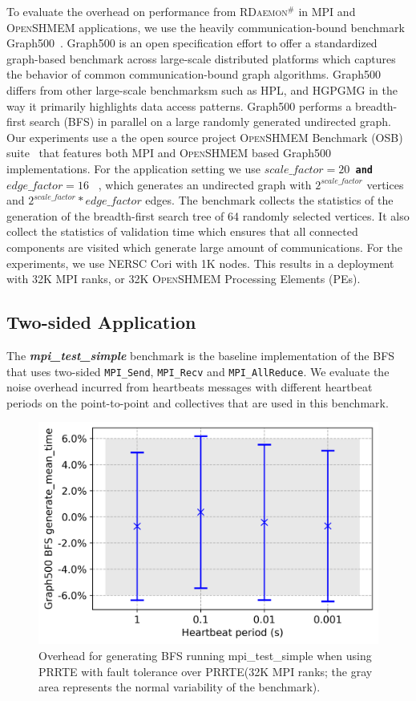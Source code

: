 \documentclass[5p,times,twocolumn]{elsarticle}
\newcommand{\mpifunc}[1]{\lstinline"MPI_#1"\xspace}
\newcommand{\prrte}[0]{\textsc{PRRTE}\xspace}
\newcommand{\mpi}[0]{\textsc{MPI}\xspace}
\newcommand{\oshmem}[0]{\textsc{OpenSHMEM}\xspace}
\newcommand{\ourwork}[0]{\textsc{RDaemon}\ensuremath{^\#}\xspace}
\begin{document}
To evaluate the overhead on performance from \ourwork
in \mpi and \oshmem applications, we use the heavily communication-bound benchmark Graph500~\cite{graph500}.
Graph500 is an open specification effort to offer a standardized graph-based
benchmark across large-scale distributed
platforms which captures the behavior of common communication-bound graph algorithms.
Graph500 differs from other large-scale
benchmarksm such as HPL, and HGPGMG in the way it primarily highlights data access patterns.
Graph500 performs a breadth-first search (BFS) in
parallel on a large randomly generated undirected graph. Our experiments use a
the open source project \oshmem Benchmark (OSB) suite~\cite{g500shmem} that features both \mpi and \oshmem based 
Graph500 implementations. For the application setting we use \texttt{\bf $scale\_factor = 20$ and $edge\_factor = 16$ }
, which generates an undirected graph with \texttt{\bf $2^{scale\_factor}$} vertices and
\texttt{\bf $2^{scale\_factor}*edge\_factor$} edges. The benchmark collects the statistics
of the generation of the breadth-first search tree of 64 randomly selected vertices. It also
collect the statistics of validation time which ensures that all connected components are visited
which generate large amount of communications. For the experiments, we use NERSC Cori with 1K nodes. This results in a deployment with 32K \mpi  ranks, or 32K \oshmem Processing Elements (PEs). 

\subsection{Two-sided Application}
The \textbf{\emph{mpi\_test\_simple}} benchmark  is the baseline implementation of the BFS that
uses two-sided \mpifunc{Send}, \mpifunc{Recv} and \mpifunc{AllReduce}.
We evaluate the noise overhead incurred from heartbeats messages with different heartbeat
periods on the point-to-point and collectives that are used in this benchmark.

\begin{figure}[h]
  \centering
    \includegraphics[width=\linewidth]{new_bfs_mean.png}
  \caption{Overhead for generating BFS running mpi\_test\_simple when using \prrte with fault tolerance over \prrte (32K \mpi ranks; the gray area represents the normal variability of the benchmark).}
  \label{fig:mean.bfs}
\end{figure}
\end{document}
